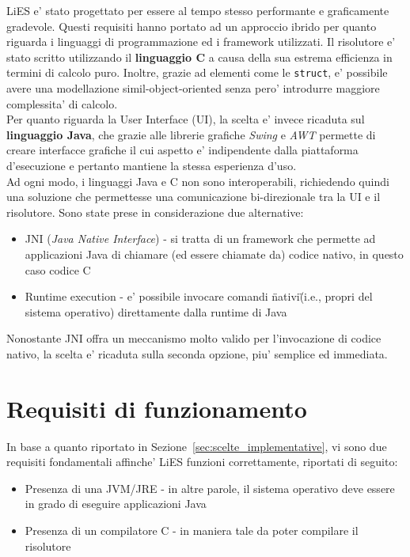 \documentclass{article}
\begin{document}
LiES e' stato progettato per essere al tempo stesso performante e graficamente gradevole. Questi requisiti hanno portato ad un approccio ibrido per quanto riguarda i linguaggi di programmazione ed i framework utilizzati. Il risolutore e' stato scritto utilizzando il \textbf{linguaggio C} a causa della sua estrema efficienza in termini di calcolo puro. Inoltre, grazie ad elementi come le \verb+struct+, e' possibile avere una modellazione simil-object-oriented senza pero' introdurre maggiore complessita' di calcolo.\\

Per quanto riguarda la User Interface (UI), la scelta e' invece ricaduta sul \textbf{linguaggio Java}, che grazie alle librerie grafiche \textit{Swing} e \textit{AWT} permette di creare interfacce grafiche il cui aspetto e' indipendente dalla piattaforma d'esecuzione e pertanto mantiene la stessa esperienza d'uso.\\

Ad ogni modo, i linguaggi Java e C non sono interoperabili, richiedendo quindi una soluzione che permettesse una comunicazione bi-direzionale tra la UI e il risolutore. Sono state prese in considerazione due alternative:
\begin{itemize}
	\item JNI (\textit{Java Native Interface}) - si tratta di un framework che permette ad applicazioni Java di chiamare (ed essere chiamate da) codice nativo, in questo caso codice C
	\item Runtime execution - e' possibile invocare comandi \"nativi\" (i.e., propri del sistema operativo) direttamente dalla runtime di Java
\end{itemize}

Nonostante JNI offra un meccanismo molto valido per l'invocazione di codice nativo, la scelta e' ricaduta sulla seconda opzione, piu' semplice ed immediata.


\section{Requisiti di funzionamento}
\label{sec:requisiti_funzionamento}

In base a quanto riportato in Sezione~\ref{sec:scelte_implementative}, vi sono due requisiti fondamentali affinche' LiES funzioni correttamente, riportati di seguito:
\begin{itemize}
	\item Presenza di una JVM/JRE - in altre parole, il sistema operativo deve essere in grado di eseguire applicazioni Java
	\item Presenza di un compilatore C - in maniera tale da poter compilare il risolutore
\end{itemize}
\end{document}
